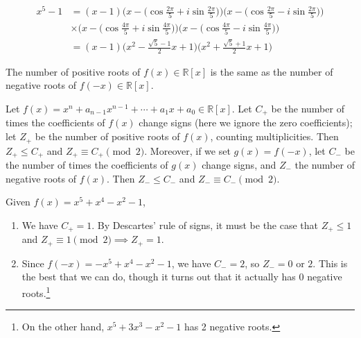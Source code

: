   \begin{example}
    \begin{align*}
      x^5 - 1 & = (x-1) \bigg( x - \Big( \cos{\frac{2\pi}{5}} + i \sin{\frac{2\pi}{5}}\Big) \bigg) \bigg( x - \Big( \cos{\frac{2\pi}{5}} - i \sin{\frac{2\pi}{5}}\Big) \bigg) \\
      & \times \bigg( x - \Big( \cos{\frac{4\pi}{5}} + i \sin{\frac{4\pi}{5}}\Big) \bigg) \bigg( x - \Big( \cos{\frac{4\pi}{5}} - i \sin{\frac{4\pi}{5}}\Big) \bigg) \\
      & = (x-1) \bigg( x^2 - \frac{\sqrt{5} - 1}{2} x + 1\bigg) \bigg( x^2 + \frac{\sqrt{5} + 1}{2} x + 1\bigg) 
    \end{align*}
  \end{example}

  \begin{lemma}
    The number of positive roots of $f(x) \in \mathbb{R}[x]$ is the same as the number of negative roots of $f(-x) \in \mathbb{R}[x]$.
  \end{lemma}

  \begin{theorem} 
    \label{thm:descartes}
    Let $f(x) = x^n + a_{n-1}x^{n-1} + \cdots + a_1x + a_0 \in \mathbb{R}[x]$. Let $C_+$ be the number of times the coefficients of $f(x)$ change signs (here we ignore the zero coefficients); let $Z_+$ be the number of positive roots of $f(x)$, counting multiplicities. Then $Z_+ \leq C_+$ and $Z_+ \equiv C_+ \pmod{2}$. Moreover, if we set $g(x) = f(-x)$, let $C_-$ be the number of times the coefficients of $g(x)$ change signs, and $Z_-$ the number of negative roots of $f(x)$. Then $Z_- \leq C_-$ and $Z_- \equiv C_- \pmod{2}$.
  \end{theorem}

  \begin{example}
    Given $f(x) = x^5 + x^4 - x^2 - 1$, 
    \begin{enumerate}
      \item We have $C_+ = 1$. By Descartes' rule of signs, it must be the case that $Z_+ \leq 1$ and $Z_+ \equiv 1 \pmod{2} \implies Z_+ = 1$. 
      \item Since $f(-x) = -x^5 + x^4 - x^2 - 1$, we have $C_- = 2$, so $Z_- = 0$ or $2$. This is the best that we can do, though it turns out that it actually has $0$ negative roots.\footnote{On the other hand, $x^5 + 3x^3 - x^2 - 1$ has 2 negative roots.} 
    \end{enumerate}
  \end{example}

